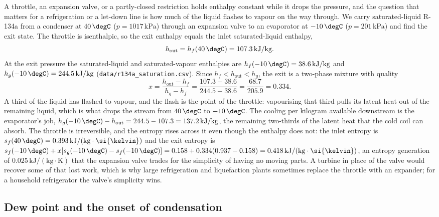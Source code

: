 A throttle, an expansion valve, or a partly-closed restriction holds
enthalpy constant while it drops the pressure, and the question that
matters for a refrigeration or a let-down line is how much of the liquid
flashes to vapour on the way through. We carry saturated-liquid R-134a
from a condenser at $40\,\degC$ ($p = 1017\,\text{kPa}$) through an
expansion valve to an evaporator at $-10\,\degC$ ($p = 201\,\text{kPa}$)
and find the exit state. The throttle is isenthalpic, so the exit
enthalpy equals the inlet saturated-liquid enthalpy,
\[
h_{\text{out}} = h_f(40\,\degC) = 107.3\,\text{kJ}/\text{kg}.
\]
At the exit pressure the saturated-liquid and saturated-vapour
enthalpies are $h_f(-10\,\degC) = 38.6\,\text{kJ}/\text{kg}$ and
$h_g(-10\,\degC) = 244.5\,\text{kJ}/\text{kg}$
(\texttt{data/r134a\_saturation.csv}). Since $h_f < h_{\text{out}} <
h_g$, the exit is a two-phase mixture with quality
\[
x = \frac{h_{\text{out}} - h_f}{h_g - h_f} = \frac{107.3 - 38.6}{244.5 -
38.6} = \frac{68.7}{205.9} = 0.334.
\]
A third of the liquid has flashed to vapour, and the flash is the point
of the throttle: vapourising that third pulls its latent heat out of the
remaining liquid, which is what drops the stream from $40\,\degC$ to
$-10\,\degC$. The cooling per kilogram available downstream is the
evaporator's job, $h_g(-10\,\degC) - h_{\text{out}} = 244.5 - 107.3 =
137.2\,\text{kJ}/\text{kg}$, the remaining two-thirds of the latent heat
that the cold coil can absorb. The throttle is irreversible, and the
entropy rises across it even though the enthalpy does not: the inlet
entropy is $s_f(40\,\degC) = 0.393\,\text{kJ}/(\text{kg}\cdot
\si{\kelvin})$ and the exit entropy is $s_f(-10\,\degC) + x[s_g(-10\,
\degC) - s_f(-10\,\degC)] = 0.158 + 0.334(0.937 - 0.158) = 0.418\,
\text{kJ}/(\text{kg}\cdot\si{\kelvin})$, an entropy generation of
$0.025\,\text{kJ}/(\text{kg}\cdot\si{\kelvin})$ that the expansion valve
trades for the simplicity of having no moving parts. A turbine in place
of the valve would recover some of that lost work, which is why large
refrigeration and liquefaction plants sometimes replace the throttle
with an expander; for a household refrigerator the valve's simplicity
wins.

\subsection{Dew point and the onset of condensation}

